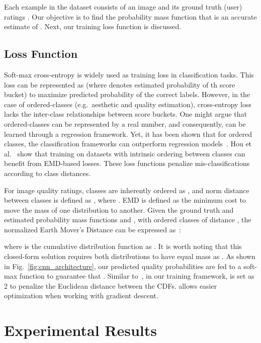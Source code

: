 \documentclass[10pt,twocolumn,twoside]{IEEEtran}
\begin{document}
Each example in the dataset consists of an image and its ground truth (user) ratings . Our objective is to find the probability mass function  that is an accurate estimate of . Next, our training loss function is discussed.

\subsection{Loss Function}
Soft-max cross-entropy is widely used as training loss in classification tasks. This loss can be represented as  (where  denotes estimated probability of th score bucket) to maximize predicted probability of the correct labels. However, in the case of ordered-classes (e.g.\ aesthetic and quality estimation), cross-entropy loss lacks the inter-class relationships between score buckets. One might argue that ordered-classes can be represented by a real number, and consequently, can be learned through a regression framework. Yet, it has been shown that for ordered classes, the classification frameworks can outperform regression models~\cite{hou2016squared, golik2013cross}. Hou et al.~\cite{hou2016squared} show that training on datasets with intrinsic ordering between classes can benefit from EMD-based losses. These loss functions penalize mis-classifications according to class distances.

For image quality ratings, classes are inherently ordered as , and norm distance between classes is defined as , where . EMD is defined as the minimum cost to move the mass of one distribution to another. Given the ground truth and estimated probability mass functions  and , with  ordered classes of distance , the normalized Earth Mover's Distance can be expressed as~\cite{levina2001earth}:


where  is the cumulative distribution function as . It is worth noting that this closed-form solution requires both distributions to have equal mass as . As shown in Fig.~\ref{fig:cnn_architecture}, our predicted quality probabilities are fed to a soft-max function to guarantee that . Similar to~\cite{hou2016squared}, in our training framework,  is set as 2 to penalize the Euclidean distance between the CDFs.  allows easier optimization when working with gradient descent.
 

\section{Experimental Results}
\label{sec:results}
\vspace{0 mm}
\end{document}
